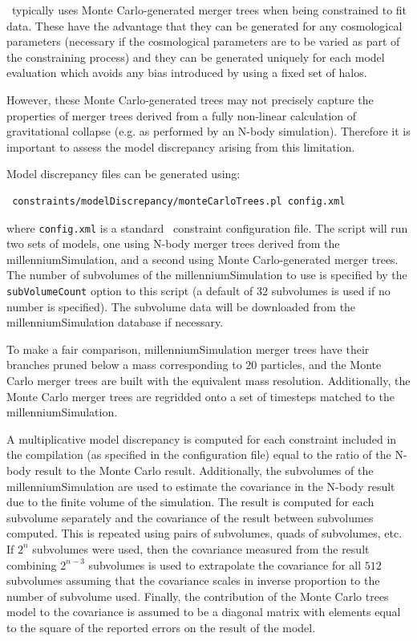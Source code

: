 \glc\ typically uses Monte Carlo-generated merger trees when being constrained to fit data. These have the advantage that they can be generated for any cosmological parameters (necessary if the cosmological parameters are to be varied as part of the constraining process) and they can be generated uniquely for each model evaluation which avoids any bias introduced by using a fixed set of halos.

However, these Monte Carlo-generated trees may not precisely capture the properties of merger trees derived from a fully non-linear calculation of gravitational collapse (e.g. as performed by an N-body simulation). Therefore it is important to assess the model discrepancy arising from this limitation.

Model discrepancy files can be generated using:
\begin{verbatim}
 constraints/modelDiscrepancy/monteCarloTrees.pl config.xml
\end{verbatim}
where {\tt config.xml} is a standard \glc\ constraint configuration file. The script will run two sets of models, one using N-body merger trees derived from the \gls{millenniumSimulation}, and a second using Monte Carlo-generated merger trees. The number of subvolumes of the \gls{millenniumSimulation} to use is specified by the {\tt subVolumeCount} option to this script (a default of $32$ subvolumes is used if no number is specified). The subvolume data will be downloaded from the \gls{millenniumSimulation} database if necessary.

To make a fair comparison, \gls{millenniumSimulation} merger trees have their branches pruned below a mass corresponding to $20$ particles, and the Monte Carlo merger trees are built with the equivalent mass resolution. Additionally, the Monte Carlo merger trees are regridded onto a set of timesteps matched to the \gls{millenniumSimulation}.

A multiplicative model discrepancy is computed for each constraint included in the compilation (as specified in the configuration file) equal to the ratio of the N-body result to the Monte Carlo result. Additionally, the subvolumes of the \gls{millenniumSimulation} are used to estimate the covariance in the N-body result due to the finite volume of the simulation. The result is computed for each subvolume separately and the covariance of the result between subvolumes computed. This is repeated using pairs of subvolumes, quads of subvolumes, etc. If $2^n$ subvolumes were used, then the covariance measured from the result combining $2^{n-3}$ subvolumes is used to extrapolate the covariance for all $512$ subvolumes assuming that the covariance scales in inverse proportion to the number of subvolume used. Finally, the contribution of the Monte Carlo trees model to the covariance is assumed to be a diagonal matrix with elements equal to the square of the reported errors on the result of the model.

